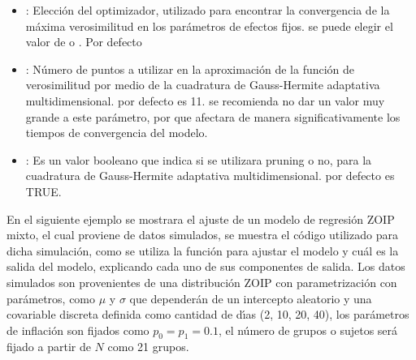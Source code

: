 \begin{itemize}[noitemsep, nolistsep]
\item {}: Elecci\'{o}n del optimizador, utilizado para encontrar la convergencia de la m\'{a}xima verosimilitud en los par\'{a}metros de efectos fijos. se puede elegir el valor de  o . Por defecto 
\item {}: N\'{u}mero de puntos a utilizar en la aproximaci\'{o}n de la funci\'{o}n de verosimilitud por medio de la cuadratura de Gauss-Hermite adaptativa multidimensional. por defecto es 11. se recomienda no dar un valor muy grande a este par\'{a}metro, por que afectara de manera significativamente los tiempos de convergencia del modelo.
\item {}: Es un valor booleano que indica si se utilizara pruning o no, para la cuadratura de Gauss-Hermite adaptativa multidimensional. por defecto es TRUE.

\end{itemize}

En el siguiente ejemplo se mostrara el ajuste de un modelo de regresi\'{o}n ZOIP mixto, el cual proviene de datos simulados, se muestra el c\'{o}digo utilizado para dicha simulaci\'{o}n, como se utiliza la funci\'{o}n  para ajustar el modelo y cu\'{a}l es la salida del modelo, explicando cada uno de sus componentes de salida. Los datos simulados son provenientes de una distribuci\'{o}n ZOIP con parametrizaci\'{o}n \cite{Stasinopoulos2} con par\'{a}metros, como $\mu$ y $\sigma$ que depender\'{a}n de un intercepto aleatorio y una covariable discreta definida como cantidad de d\'{\i}as (2, 10, 20, 40), los par\'{a}metros de inflaci\'{o}n son fijados como $p_0=p_1=0.1$, el n\'{u}mero de grupos o sujetos ser\'{a} fijado a partir de $N$ como 21 grupos.

